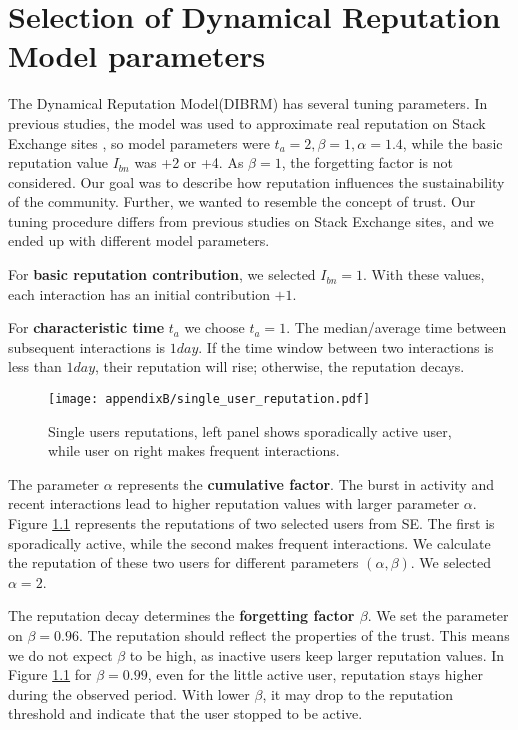 \chapter{Selection of Dynamical Reputation Model parameters}
\label{App:parameters}

The Dynamical Reputation Model(DIBRM) has several tuning parameters. In previous studies, the model \cite{melnikov2018toward,yashkina2020} was used to approximate real reputation on Stack Exchange sites \cite{yashkina2020}, so model parameters were $t_a =2, \beta = 1, \alpha = 1.4$, while the basic reputation value $I_{bn}$ was +2 or +4. As $\beta=1$, the forgetting factor is not considered. Our goal was to describe how reputation influences the sustainability of the community. Further, we wanted to resemble the concept of trust. Our tuning procedure differs from previous studies on Stack Exchange sites, and we ended up with different model parameters. 

For \textbf{basic reputation contribution}, we selected $I_{bn}=1$. With these values, each interaction has an initial contribution $+1$. 

For \textbf{characteristic time} $t_a$ we choose $t_a=1$. The median/average time between subsequent interactions is $1 day$. If the time window between two interactions is less than $1 day$, their reputation will rise; otherwise, the reputation decays.

\begin{figure}[h]
	\centering
	\texttt{[image: appendixB/single\_user\_reputation.pdf]}
	\caption[Single users reputations.]{Single users reputations, left panel shows sporadically active user, while user on right makes frequent interactions.}
	\label{fig:singleuser}
\end{figure} 

The {parameter $\alpha$} represents the \textbf{cumulative factor}. The burst in activity and recent interactions lead to higher reputation values with larger parameter $\alpha$. Figure \ref{fig:singleuser} represents the reputations of two selected users from SE. The first is sporadically active, while the second makes frequent interactions. We calculate the reputation of these two users for different parameters $(\alpha, \beta)$. We selected $\alpha=2$.  

The reputation decay determines the \textbf{forgetting factor $\beta$}. We set the parameter on $\beta=0.96$. The reputation should reflect the properties of the trust. This means we do not expect $\beta$ to be high, as inactive users keep larger reputation values. In Figure \ref{fig:singleuser} for $\beta=0.99$, even for the little active user, reputation stays higher during the observed period. With lower $\beta$, it may drop to the reputation threshold and indicate that the user stopped to be active.  

